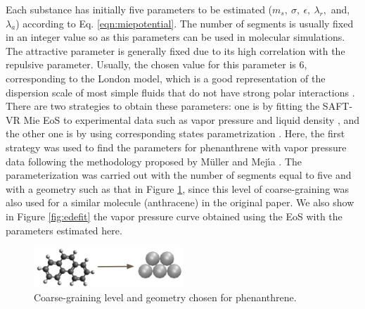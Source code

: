 \documentclass[final,12p,times,twocolumn]{elsarticle}
\begin{document}
	Each substance has initially five parameters to be estimated ($m_s,\ \sigma,\ \epsilon,\ \lambda_{r},$ and, $ \lambda_{a}$) according to Eq. \ref{eqn:miepotential}. The number of segments is usually fixed in an integer value so as this parameters can be used in molecular simulations. The attractive parameter is generally fixed due to its high correlation with the repulsive parameter. Usually, the chosen value for this parameter is 6, corresponding to the London model, which is a good representation of the dispersion scale of most simple fluids that do not have strong polar interactions \cite{ramrattan2015,herdes2015}.  There are two strategies to obtain these parameters: one is by fitting the SAFT-VR Mie EoS to experimental data such as vapor pressure and liquid density \cite{avendano2013}, and the other one is by using corresponding states parametrization \cite{mejia2014}. Here, the first strategy was used to find the parameters for phenanthrene with vapor pressure data \cite{murphy,osborn} following the methodology proposed by M\"{u}ller and Mej\'{\i}a \cite{muller2017}.  The parameterization was carried out with the number of segments equal to five and with a geometry such as that in Figure \ref{fig:fen5}, since this level of coarse-graining was also used for a similar molecule (anthracene) in the original paper. We also show in Figure \ref{fig:edefit} the vapor pressure curve obtained using the EoS with the parameters estimated here.
	
	\begin{figure}[th]
		\centering
		\includegraphics[width=0.50\textwidth]{Figures/fe5cg}
		\caption{Coarse-graining level and geometry chosen for phenanthrene.}
		\label{fig:fen5}
	\end{figure}
	
\end{document}
